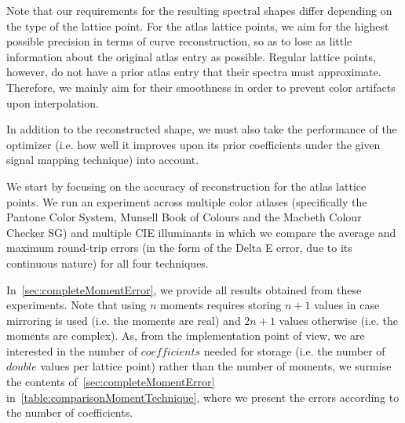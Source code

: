 Note that our requirements for the resulting spectral shapes differ depending on the type of the lattice point. For the atlas lattice points, we aim for the highest possible precision in terms of curve reconstruction, so as to lose as little information about the original atlas entry as possible. Regular lattice points, however, do not have a prior atlas entry that their spectra must approximate. Therefore, we mainly aim for their smoothness in order to prevent color artifacts upon interpolation.

In addition to the reconstructed shape, we must also take the performance of the optimizer (i.e. how well it improves upon its prior coefficients under the given signal mapping technique) into account.

We start by focusing on the accuracy of reconstruction for the atlas lattice points. We run an experiment across multiple color atlases (specifically the Pantone Color System, Munsell Book of Colours and the Macbeth Colour Checker SG) and multiple CIE illuminants in which we compare the average and maximum round-trip errors (in the form of the Delta E error, due to its continuous nature) for all four techniques.

In~\cref{sec:completeMomentError}, we provide all results obtained from these experiments. Note that using $n$ moments requires storing $n+1$ values in case mirroring is used (i.e. the moments are real) and $2n+1$ values otherwise (i.e. the moments are complex). As, from the implementation point of view, we are interested in the number of $coefficients$ needed for storage (i.e. the number of $double$ values per lattice point) rather than the number of moments, we surmise the contents of~\cref{sec:completeMomentError} in~\cref{table:comparisonMomentTechnique}, where we present the errors according to the number of coefficients.

